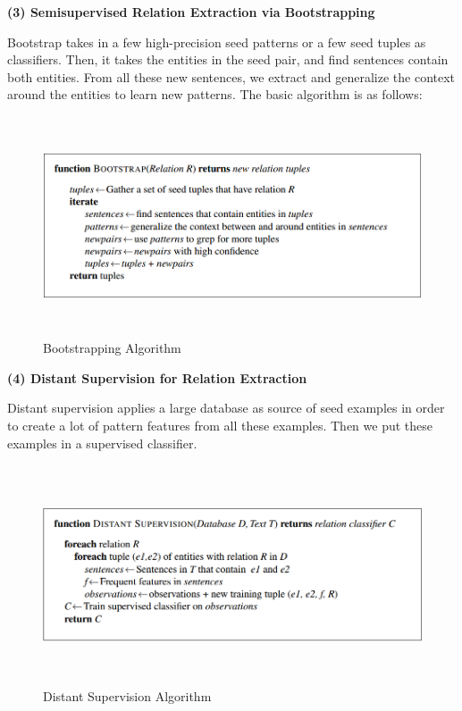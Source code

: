 \documentclass[a4paper,12pt]{report}
\begin{document}
\noindent
\textbf{(3) Semisupervised Relation Extraction via Bootstrapping}

\noindent
Bootstrap takes in a few high-precision seed patterns or a few seed tuples as classifiers. Then, it takes the entities in the seed pair, and find sentences contain both entities. From all these new sentences, we extract and generalize the context around the entities to learn new patterns. The basic algorithm is as follows: 

\begin{figure}[h]
\centering	
\includegraphics[width=16cm, height=6.5cm]{"pic3"}
\caption{Bootstrapping Algorithm}
\end{figure} 

\pagebreak
\noindent
\textbf{(4) Distant Supervision for Relation Extraction}

\noindent
Distant supervision applies a large database as source of seed examples in order to create a lot of pattern features from all these examples. Then we put these examples in a supervised classifier. 

\begin{figure}[h]
\centering	
\includegraphics[width=17cm, height=6.5cm]{"pic4"}
\caption{Distant Supervision Algorithm}
\end{figure}
\end{document}
